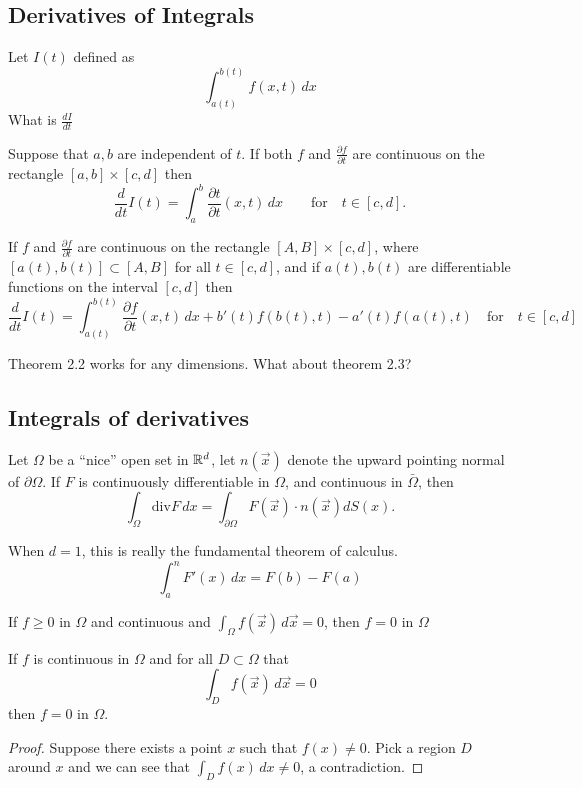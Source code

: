 \subsection{Derivatives of Integrals}
\begin{question}
	Let $I(t)$ defined as
	\[\int_{a(t)}^{b(t)} f(x,t)\, dx\]
	What is $\frac{dI}{dt}$
\end{question}
\begin{theorem}
	Suppose that $a,b$ are independent of $t$. If both $f$ and $\frac{\partial f}{\partial t}$ are continuous on the rectangle $[a,b] \times [c,d]$ then
	\[ \frac{d}{dt} I(t) = \int_a^b \frac{\partial t}{\partial t} (x,t)\,dx \qquad \mathrm{for} \quad t \in [c,d].\]
\end{theorem}
\begin{theorem}
	If $f$ and $\frac{\partial f}{\partial t}$ are continuous on the rectangle $[A, B] \times [c,d]$, where $[a(t),b(t)] \subset [A,B]$ for all $t \in [c,d]$, and if $a(t),b(t)$ are differentiable functions on the interval $[c,d]$ then
	\[ \frac{d}{dt} I(t) = \int_{a(t)}^{b(t)} \frac{\partial f}{\partial t} (x,t)\, dx + b'(t)f(b(t),t) - a'(t)f(a(t),t) \quad \mathrm{for} \quad t \in [c,d]\]
\end{theorem}
\begin{remark}
	Theorem 2.2 works for any dimensions. What about theorem 2.3?
\end{remark}
\subsection{Integrals of derivatives}
\begin{theorem}
	Let $\Omega$ be a ``nice'' open set in $\mathbb R^d$, let $n(\vec x)$ denote the upward pointing normal of $\partial \Omega$. If $F$ is continuously differentiable in $\Omega$, and continuous in $\bar \Omega$, then
	\[ \int_\Omega \mathrm{div} F \, dx = \int_{\partial \Omega} F(\vec x) \cdot n (\vec x) dS(x).\] 
\end{theorem}
\begin{remark}
	When $d = 1$, this is really the fundamental theorem of calculus.
	\[ \int_a^n F'(x)\,dx = F(b) - F(a)\]
\end{remark}
\begin{theorem}
	If $f \geq 0$ in $\Omega$ and continuous and $\int_\Omega f(\vec x)\,d\vec x = 0$, then $f = 0$ in $\Omega$
\end{theorem}
\begin{theorem}
	If $f$ is continuous in $\Omega$ and for all $D \subset \Omega$ that
	\[ \int_D f(\vec x)\, d\vec x = 0\]
	then $f = 0$ in $\Omega$.
\end{theorem}
\begin{proof}
	Suppose there exists a point $x$ such that $f(x) \neq 0$. Pick a region $D$ around $x$ and we can see that $\int_D f(x) \, dx \neq 0$, a contradiction.
\end{proof}
